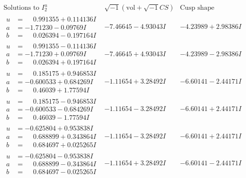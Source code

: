 \documentclass[1p]{elsarticle_modified}
\theoremstyle{definition}
\newcommand{\I}{\sqrt{-1}}
\begin{document}
$$\begin{array}{c|c|c}  
\text{Solutions to }I^u_{2}& \I (\text{vol} + \sqrt{-1}CS) & \text{Cusp shape}\\
 \hline 
\begin{aligned}
u &= \phantom{-}0.991355 + 0.114136 I \\
a &= -1.71230 - 0.09769 I \\
b &= \phantom{-}0.026394 - 0.197164 I\end{aligned}
 & -7.46645 - 4.93043 I & -4.23989 + 2.98386 I \\ \hline\begin{aligned}
u &= \phantom{-}0.991355 - 0.114136 I \\
a &= -1.71230 + 0.09769 I \\
b &= \phantom{-}0.026394 + 0.197164 I\end{aligned}
 & -7.46645 + 4.93043 I & -4.23989 - 2.98386 I \\ \hline\begin{aligned}
u &= \phantom{-}0.185175 + 0.946853 I \\
a &= -0.600533 + 0.684269 I \\
b &= \phantom{-}0.46039 + 1.77594 I\end{aligned}
 & -1.11654 + 3.28492 I & -6.60141 - 2.44171 I \\ \hline\begin{aligned}
u &= \phantom{-}0.185175 - 0.946853 I \\
a &= -0.600533 - 0.684269 I \\
b &= \phantom{-}0.46039 - 1.77594 I\end{aligned}
 & -1.11654 - 3.28492 I & -6.60141 + 2.44171 I \\ \hline\begin{aligned}
u &= -0.625804 + 0.953838 I \\
a &= \phantom{-}0.688899 + 0.343864 I \\
b &= \phantom{-}0.684697 + 0.025265 I\end{aligned}
 & -1.11654 - 3.28492 I & -6.60141 + 2.44171 I \\ \hline\begin{aligned}
u &= -0.625804 - 0.953838 I \\
a &= \phantom{-}0.688899 - 0.343864 I \\
b &= \phantom{-}0.684697 - 0.025265 I\end{aligned}
 & -1.11654 + 3.28492 I & -6.60141 - 2.44171 I \\ \hline\begin{aligned}

\end{aligned}
\end{array}$$
\end{document}
